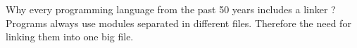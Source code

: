 \documentclass{article}
\begin{document}
\noindent Why every programming language from the past 50 years includes a linker ?\\
Programs always use modules separated in different files. Therefore the need for linking them into one big file.
\end{document}
